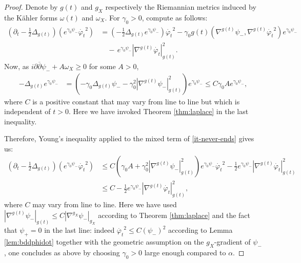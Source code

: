 \documentclass[a4paper,11pt,leqno,english]{smfart}
\theoremstyle{plain}
\theoremstyle{plain}
\numberwithin{equation}{section} %
\numberwithin{figure}{section} %
\theoremstyle{plain}
\theoremstyle{plain}
\theoremstyle{remark}
\theoremstyle{remark}
\theoremstyle{definition}
\theoremstyle{plain}
\theoremstyle{plain}
\theoremstyle{definition}
\newcommand{\f}{\varphi}
\begin{document}
\begin{proof}
Denote by $g(t)$ and $g_X$ respectively the Riemannian metrics induced by the K\"ahler forms $\omega(t)$ and $\omega_X$.
For $\gamma_0>0$, compute as follows:
\begin{equation}
\begin{split}\label{it-never-ends}
\left(\partial_t-\frac{1}{2}\Delta_{g(t)}\right)\left(e^{\gamma_0\psi_{-}}\dot{\f_t}^2\right)&=\left(-\frac{1}{2}\Delta_{g(t)}e^{\gamma_0\psi_{-}}\right)\dot{\f_t}^2-\gamma_0g(t)\left(\nabla^{g(t)}\psi_{-},\nabla^{g(t)}\dot{\f_t}^2\right)e^{\gamma_0\psi_{-}}\\
&\quad-\,e^{\gamma_0\psi_{-}}|\nabla^{g(t)}\dot{\f_t}|^2_{g(t)}.
\end{split}
\end{equation}
Now, as $i\partial\overline{\partial}\psi_{-}+A\omega_X\geq 0$ for some $A> 0$, 
\begin{equation*}
\begin{split}
-\Delta_{g(t)}e^{\gamma_0\psi_{-}}&=\left(-\gamma_0\Delta_{g(t)} \psi_{-}-\gamma_0^2|\nabla^{g(t)}\psi_{-}|^2_{g(t)}\right)e^{\gamma_0\psi_{-}}\leq C\gamma_0 Ae^{\gamma_0\psi_{-}},
\end{split}
\end{equation*}
where $C$ is a positive constant that may vary from line to line but which is independent of $t>0$. Here we have invoked Theorem \ref{thm:laplace} in the last inequality. 

Therefore, Young's inequality applied to the mixed term of \eqref{it-never-ends} gives us:
\begin{equation}
\begin{split}\label{est-0-undergrad}
\left(\partial_t-\frac{1}{2}\Delta_{g(t)}\right)\left(e^{\gamma_0\psi_{-}}\dot{\f_t}^2\right)&
\leq C\left(\gamma_0A+\gamma_0^2|\nabla^{g(t)}\psi_{-}|^2_{g(t)}\right)e^{\gamma_0\psi_{-}}\dot{\f_t}^2 -\frac{1}{2}e^{\gamma_0\psi_{-}}|\nabla^{g(t)}\dot{\f_t}|^2_{g(t)}\\
&\leq C -\frac{1}{2}e^{\gamma_0\psi_{-}}|\nabla^{g(t)}\dot{\f_t}|^2_{g(t)} ,
\end{split}
\end{equation}
where $C$ may vary from line to line. Here we have used  $|\nabla^{g(t)}\psi_{-}|_{g(t)}\leq C|\nabla^{g_X}\psi_{-}|_{g_X}$ according to Theorem \ref{thm:laplace} and the fact that $\psi_+=0$ in the last line: indeed  $\dot{\f_t}^2\leq C(\psi_{-})^2$ according to Lemma \ref{lem:bddphidot} together with the geometric assumption on the $g_X$-gradient of $\psi_{-}$, one concludes as above by choosing $\gamma_0>0$ large enough compared to $\alpha$. 


\end{proof}
\end{document}
